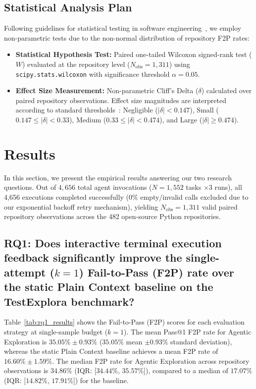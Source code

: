 \documentclass[conference]{IEEEtran}
\begin{document}
\subsection{Statistical Analysis Plan}
\label{subsec:stat}
Following guidelines for statistical testing in software engineering~\cite{arcuri2011practical}, we employ non-parametric tests due to the non-normal distribution of repository F2P rates:
\begin{itemize}
    \item \textbf{Statistical Hypothesis Test:} Paired one-tailed Wilcoxon signed-rank test ($W$) evaluated at the repository level ($N_{\text{obs}} = 1,311$) using \texttt{scipy.stats.wilcoxon} with significance threshold $\alpha = 0.05$.
    \item \textbf{Effect Size Measurement:} Non-parametric Cliff's Delta ($\delta$) calculated over paired repository observations. Effect size magnitudes are interpreted according to standard thresholds~\cite{arcuri2011practical, cliffs}: Negligible ($|\delta| < 0.147$), Small ($0.147 \le |\delta| < 0.33$), Medium ($0.33 \le |\delta| < 0.474$), and Large ($|\delta| \ge 0.474$).
\end{itemize}

\section{Results}
\label{sec:results}

In this section, we present the empirical results answering our two research questions. Out of $4,656$ total agent invocations ($N=1,552$ tasks $\times 3$ runs), all 4,656 executions completed successfully ($0\%$ empty/invalid calls excluded due to our exponential backoff retry mechanism), yielding $N_{\text{obs}} = 1,311$ valid paired repository observations across the 482 open-source Python repositories.

\subsection{RQ1: Does interactive terminal execution feedback significantly improve the single-attempt ($k=1$) Fail-to-Pass (F2P) rate over the static Plain Context baseline on the TestExplora benchmark?}

Table~\ref{tab:rq1_results} shows the Fail-to-Pass (F2P) scores for each evaluation strategy at single-sample budget ($k=1$). The mean Pass@1 F2P rate for Agentic Exploration is $35.05\% \pm 0.93\%$ ($35.05\%$ mean $\pm 0.93\%$ standard deviation), whereas the static Plain Context baseline achieves a mean F2P rate of $16.60\% \pm 1.59\%$. The median F2P rate for Agentic Exploration across repository observations is $34.86\%$ (IQR: [$34.44\%$, $35.57\%$]), compared to a median of $17.07\%$ (IQR: [$14.82\%$, $17.91\%$]) for the baseline.
\end{document}
